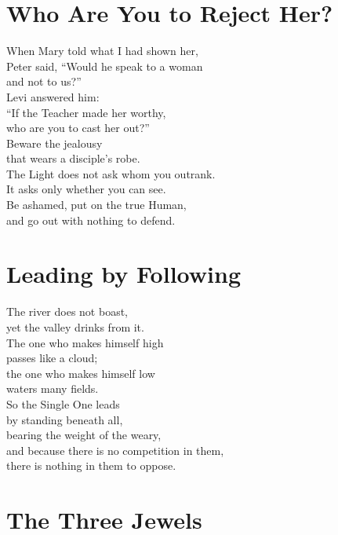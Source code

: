 \documentclass[10pt, openright]{book}
\newcommand{\sectionbreak}{\filbreak}
\newcommand{\sayingsource}[1]{\par\nopagebreak\vspace{0.3\baselineskip}{\raggedleft\footnotesize\itshape #1\par}}
\begin{document}
\sayingsource{Tao Te Ching 65 · Philip}

\sectionbreak

\section{Who Are You to Reject Her?}\label{who-are-you-to-reject-her}

When Mary told what I had shown her,\\
Peter said, ``Would he speak to a woman\\
and not to us?''\\
Levi answered him:\\
``If the Teacher made her worthy,\\
who are you to cast her out?''\\
Beware the jealousy\\
that wears a disciple's robe.\\
The Light does not ask whom you outrank.\\
It asks only whether you can see.\\
Be ashamed, put on the true Human,\\
and go out with nothing to defend.

\sayingsource{Mary 17--18}

\sectionbreak

\section{Leading by Following}\label{leading-by-following}

The river does not boast,\\
yet the valley drinks from it.\\
The one who makes himself high\\
passes like a cloud;\\
the one who makes himself low\\
waters many fields.\\
So the Single One leads\\
by standing beneath all,\\
bearing the weight of the weary,\\
and because there is no competition in them,\\
there is nothing in them to oppose.

\sayingsource{Tao Te Ching 66 · Mark 10:43--45}

\sectionbreak

\section{The Three Jewels}\label{the-three-jewels}
\end{document}
